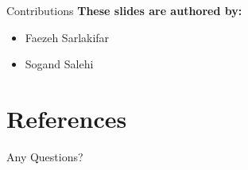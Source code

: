 \documentclass[serif, aspectratio=169]{beamer}
\begin{document}
\begin{frame}{Contributions}
	\textbf{These slides are authored by:}
	\begin{itemize}
		\item Faezeh Sarlakifar
		\item Sogand Salehi
	\end{itemize}
	
\end{frame}

\section{References}

\begin{frame}[allowframebreaks]
	
	
	\nocite{*} %
\end{frame}

\begin{frame}
    \begin{center}
        {\Huge Any Questions?}
    \end{center}
\end{frame}
\end{document}
